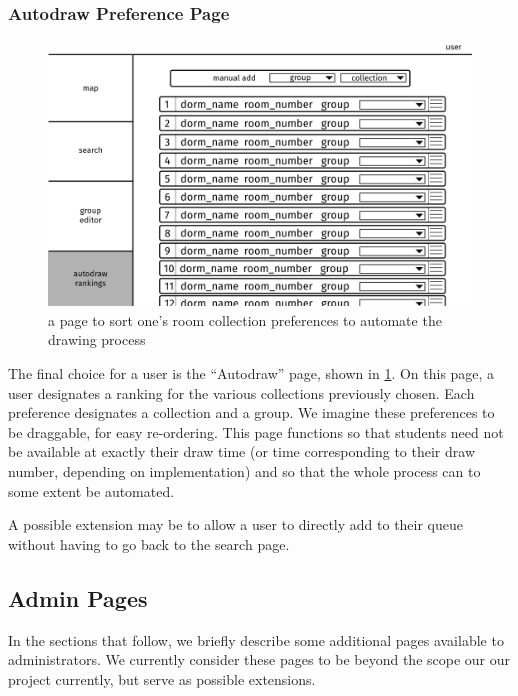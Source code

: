 \subsubsection{Autodraw Preference Page}
\begin{figure} \centering
\includegraphics[scale=.15]{wireframe/autodraw}
\caption{a page to sort one's room collection preferences to automate the
    drawing process}
\label{fig:wireprefs}
\end{figure}

The final choice for a user is the ``Autodraw'' page, shown in
\cref{fig:wireprefs}. On this page, a user designates a ranking for the various
collections previously chosen. Each preference designates a collection and a
group. We imagine these preferences to be draggable, for easy re-ordering. This
page functions so that students need not be available at exactly their draw time
(or time corresponding to their draw number, depending on implementation) and so
that the whole process can to some extent be automated.

A possible extension may be to allow a user to directly add to their queue
without having to go back to the search page.

\subsection{Admin Pages}

In the sections that follow, we briefly describe some additional pages available
to administrators. We currently consider these pages to be beyond the scope our
our project currently, but serve as possible extensions.

